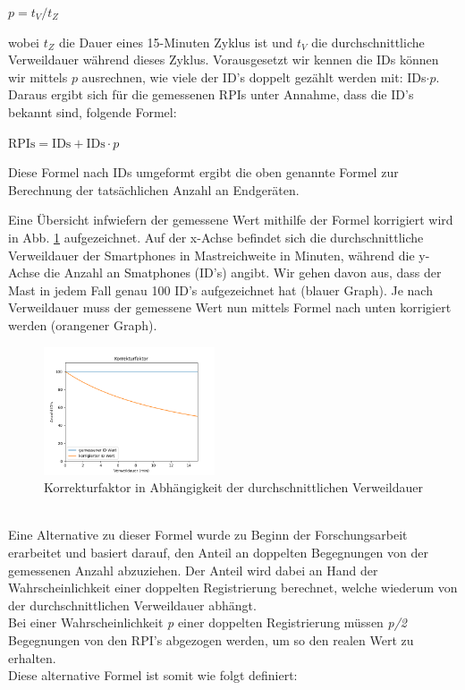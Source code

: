 \documentclass[conference]{IEEEtran}
\begin{document}
\centerline{$p = t_V / t_Z$}
wobei $t_Z$ die Dauer eines 15-Minuten Zyklus ist und $t_V$ die durchschnittliche Verweildauer während dieses Zyklus.
Vorausgesetzt wir kennen die \glqq IDs\grqq{} können wir mittels $p$ ausrechnen, wie viele der ID's doppelt gezählt werden mit: IDs$\cdot p$. 
Daraus ergibt sich für die gemessenen \glqq RPIs\grqq{} unter Annahme, dass die ID's bekannt sind, folgende Formel: 
\centerline{$\text{RPIs} = \text{IDs} + \text{IDs} \cdot p $}
Diese Formel nach \glqq IDs\grqq{} umgeformt ergibt die oben genannte Formel zur Berechnung der tatsächlichen Anzahl an Endgeräten.

Eine Übersicht infwiefern der gemessene Wert mithilfe der Formel korrigiert wird in Abb. \ref{cor_factor} aufgezeichnet. 
Auf der x-Achse befindet sich die durchschnittliche Verweildauer der Smartphones in Mastreichweite in Minuten, während die y-Achse die Anzahl an Smatphones (ID's) angibt.
Wir gehen davon aus, dass der Mast in jedem Fall genau 100 ID's aufgezeichnet hat (blauer Graph). Je nach Verweildauer muss der gemessene Wert nun mittels Formel nach unten korrigiert werden (orangener Graph).\\
\begin{figure}[h]
	\centering
	\includegraphics[width=0.45\textwidth]{"Korrekturfaktor"}
	\caption{Korrekturfaktor in Abhängigkeit der durchschnittlichen Verweildauer}
	\label{cor_factor}
\end{figure} \\

Eine Alternative zu dieser Formel wurde zu Beginn der Forschungsarbeit erarbeitet und basiert darauf, den Anteil an doppelten Begegnungen von der gemessenen Anzahl abzuziehen. Der Anteil wird dabei an Hand der Wahrscheinlichkeit einer doppelten Registrierung berechnet, welche wiederum von der durchschnittlichen Verweildauer abhängt.\\
Bei einer Wahrscheinlichkeit \textit{p} einer doppelten Registrierung müssen \textit{p/2} Begegnungen von den RPI's abgezogen werden, um so den realen Wert zu erhalten.\\
Diese alternative Formel ist somit wie folgt definiert:
\end{document}
